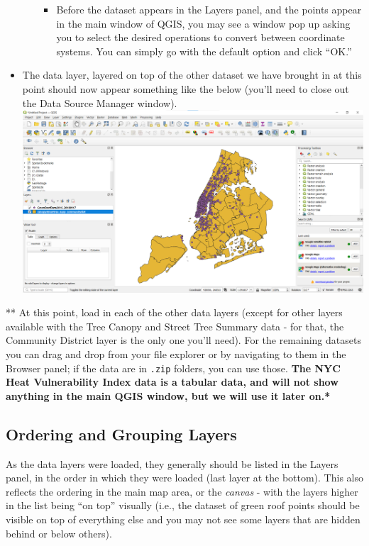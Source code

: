 \documentclass[
  letterpaper,
  DIV=11,
  numbers=noendperiod]{scrreprt}
\providecommand{\tightlist}{%
  \setlength{\itemsep}{0pt}\setlength{\parskip}{0pt}}\usepackage{longtable,booktabs,array}
\begin{document}
\begin{itemize}
\begin{itemize}
    \begin{itemize}
    \tightlist
    \item
      Before the dataset appears in the Layers panel, and the points
      appear in the main window of QGIS, you may see a window pop up
      asking you to select the desired operations to convert between
      coordinate systems. You can simply go with the default option and
      click ``OK.''
    \end{itemize}
  \end{itemize}
\item
  The data layer, layered on top of the other dataset we have brought in
  at this point should now appear something like the below (you'll need
  to close out the Data Source Manager window).
  \includegraphics{./images/greenroofs_firstload.png}
\end{itemize}

** At this point, load in each of the other data layers (except for
other layers available with the Tree Canopy and Street Tree Summary data
- for that, the Community District layer is the only one you'll need).
For the remaining datasets you can drag and drop from your file explorer
or by navigating to them in the Browser panel; if the data are in
\texttt{.zip} folders, you can use those. \textbf{The NYC Heat
Vulnerability Index data is a tabular data, and will not show anything
in the main QGIS window, but we will use it later on.* }

\hypertarget{ordering-and-grouping-layers}{%
\subsection{Ordering and Grouping
Layers}\label{ordering-and-grouping-layers}}

As the data layers were loaded, they generally should be listed in the
Layers panel, in the order in which they were loaded (last layer at the
bottom). This also reflects the ordering in the main map area, or the
\emph{canvas} - with the layers higher in the list being ``on top''
visually (i.e., the dataset of green roof points should be visible on
top of everything else and you may not see some layers that are hidden
behind or below others).
\end{document}
